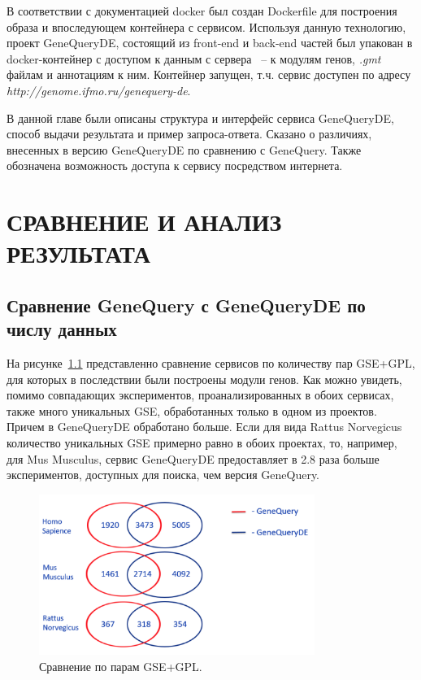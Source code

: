 \documentclass[times,specification,annotation]{itmo-student-thesis}
\begin{document}
В соответствии с документацией docker \cite{DockerDock} был создан Dockerfile для построения образа и впоследующем контейнера с сервисом. Используя данную технологию, проект GeneQueryDE, состоящий из front-end и back-end частей был упакован в docker-контейнер с доступом к данным с сервера ~-- к модулям генов, \textit{.gmt} файлам и аннотациям к ним. Контейнер запущен, т.ч. сервис доступен по адресу \textit{http://genome.ifmo.ru/genequery-de}.  

\chapterconclusion

В данной главе были описаны структура и интерфейс сервиса GeneQueryDE, способ выдачи результата и пример запроса-ответа. Сказано о различиях, внесенных в версию GeneQueryDE по сравнению с GeneQuery. Также обозначена возможность доступа к сервису посредством интернета. 

\chapter{СРАВНЕНИЕ И АНАЛИЗ РЕЗУЛЬТАТА}

\section{Сравнение GeneQuery с GeneQueryDE по числу данных}

На рисунке~\ref{GSEnumbers} представленно сравнение сервисов по количеству пар GSE+GPL, для которых в последствии были построены модули генов. Как можно увидеть, помимо совпадающих экспериментов, проанализированных в обоих сервисах, также много уникальных GSE, обработанных только в одном из проектов. Причем в GeneQueryDE обработано больше. Если для вида Rattus Norvegicus количество уникальных GSE примерно равно в обоих проектах, то, например, для Mus Musculus, сервис GeneQueryDE предоставляет в 2.8 раза больше экспериментов, доступных для поиска, чем версия GeneQuery. 

\begin{figure}[!h]
    \caption{Сравнение по парам GSE+GPL.}\label{GSEnumbers}
    \centering
    \includegraphics[width=0.8\textwidth]{GSEnumbers}
\end{figure}
\end{document}
